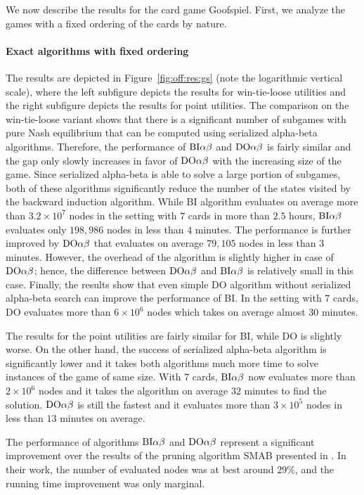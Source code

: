 We now describe the results for the card game Goofspiel.
First, we analyze the games with a fixed ordering of the cards by nature. 

\paragraph{Exact algorithms with fixed ordering}
The results are depicted in Figure~\ref{fig:off:res:gs} (note the logarithmic vertical scale), where the left subfigure depicts the results for win-tie-loose utilities and the right subfigure depicts the results for point utilities.
The comparison on the win-tie-loose variant shows that there is a significant number of subgames with pure Nash equilibrium that can be computed using serialized alpha-beta algorithms.
Therefore, the performance of $\textrm{BI}\alpha\beta$ and $\textrm{DO}\alpha\beta$ is fairly similar and the gap only slowly increases in favor of $\textrm{DO}\alpha\beta$ with the increasing size of the game.
Since serialized alpha-beta is able to solve a large portion of subgames, both of these algorithms significantly reduce the number of the states visited by the backward induction algorithm.
While \textsc{BI} algorithm evaluates on average more than $3.2\times10^7$ nodes in the setting with $7$ cards in more than $2.5$ hours, $\textrm{BI}\alpha\beta$ evaluates only $198,986$ nodes in less than $4$ minutes. 
The performance is further improved by $\textrm{DO}\alpha\beta$ that evaluates on average $79,105$ nodes in less than $3$ minutes.
However, the overhead of the algorithm is slightly higher in case of $\textrm{DO}\alpha\beta$; hence, the difference between $\textrm{DO}\alpha\beta$ and $\textrm{BI}\alpha\beta$ is relatively small in this case.
Finally, the results show that even simple \textsc{DO} algorithm without serialized alpha-beta search can improve the performance of \textsc{BI}.
In the setting with $7$ cards, \textsc{DO} evaluates more than $6\times10^6$ nodes which takes on average almost 30 minutes.

The results for the point utilities are fairly similar for BI, while DO is slightly worse. 
On the other hand, the success of serialized alpha-beta algorithm is significantly lower and it takes both algorithms much more time to solve instances of the game of same size.
With $7$ cards, $\textrm{BI}\alpha\beta$ now evaluates more than $2\times10^6$ nodes and it takes the algorithm on average $32$ minutes to find the solution.
$\textrm{DO}\alpha\beta$ is still the fastest and it evaluates more than $3\times10^5$ nodes in less than $13$ minutes on average.

The performance of algorithms $\textrm{BI}\alpha\beta$ and $\textrm{DO}\alpha\beta$ represent a significant improvement over the results of the pruning algorithm 
SMAB presented in \cite{Saffidine12SMAB}. 
In their work, the number of evaluated nodes was at best around $29\%$, and the running time improvement was only marginal. 

